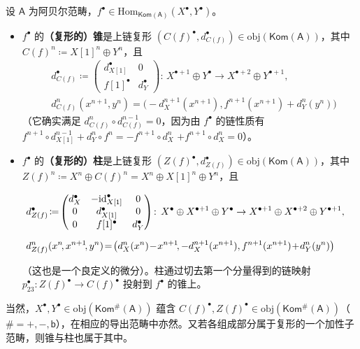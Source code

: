 \begin{Def}\label{coneofcomplexes}
	设 $\mathsf{A}$ 为阿贝尔范畴，$f^\bullet\in\text{Hom}_\mathsf{Kom(A)}(X^\bullet, Y^\bullet)$。
	\begin{itemize}[leftmargin=0.5cm]
		\item $f^\bullet$ 的\textbf{（复形的）锥}是上链复形 $(C(f)^\bullet, d_{C(f)}^\bullet)\in\text{obj}(\mathsf{Kom(A)})$，其中 $C(f)^n\coloneqq X[1]^n\oplus Y^n$，且
		\begin{align}
			&d_{C(f)}^\bullet \coloneqq \begin{pmatrix} d_{X[1]}^\bullet & 0 \\ f[1]^\bullet & d_Y^\bullet \end{pmatrix}\!:\,X^{\bullet+1}\oplus Y^\bullet\rightarrow X^{\bullet+2}\oplus Y^{\bullet+1}, \nonumber\\[0.2cm] 
			&d_{C(f)}^n(x^{n+1},y^n)=\big(-d_X^{n+1}(x^{n+1}),f^{n+1}(x^{n+1})+d_Y^n(y^n)\big)
		\end{align}
		（它确实满足 $d_{C(f)}^n\circ d_{C(f)}^{n-1}=0$，因为由 $f^\bullet$ 的链性质有 $f^{n+1}\circ d_{X[1]}^{n-1} + d_Y^n\circ f^n= -f^{n+1}\circ d_X^n$ $+ f^{n+1}\circ d_X^n=0$）。 
		
		\item $f^\bullet$ 的\textbf{（复形的）柱}是上链复形 $(Z(f)^\bullet, d_{Z(f)}^\bullet)\in\text{obj}(\mathsf{Kom(A)})$，其中 $Z(f)^n\coloneqq X^n\oplus C(f)^n= X^n\oplus X[1]^n\oplus Y^n$，且 
		\begingroup
		\allowdisplaybreaks
		\begin{small}\begin{align}
				&\mkern-16mu d_{Z(f)}^\bullet \!\coloneqq\! \begin{pmatrix} d_X^\bullet & -\text{id}_{X[1]}^\bullet & 0 \\ 0 & d_{X[1]}^\bullet & 0 \\ 0 & f[1]^\bullet & d_Y^\bullet \end{pmatrix}\!:\, X^\bullet\oplus X^{\bullet+1}\oplus Y^\bullet\rightarrow X^{\bullet+1}\oplus X^{\bullet+2}\oplus Y^{\bullet+1}, \nonumber\\[0.2cm]
				&\mkern-16mu d_{Z(f)}^n(x^n\!,x^{n+1}\!,y^n)\!=\!\big(d_X^n(x^n)\!-\! x^{n+1}\!,-d_X^{n+1}(x^{n+1}), f^{n+1}(x^{n+1})\!+\! d_Y^n(y^n)\big)
		\end{align}\end{small}
		\endgroup%
		（这也是一个良定义的微分）。柱通过切去第一个分量得到的链映射 $p_{23}^\bullet:Z(f)^\bullet\rightarrow C(f)^\bullet$ 投射到 $f^\bullet$ 的锥上。
	\end{itemize}
	当然，$X^\bullet, Y^\bullet\in\text{obj}(\mathsf{Kom^\#\!(A)})$ 蕴含 $C(f)^\bullet, Z(f)^\bullet\in\text{obj}(\mathsf{Kom^\#\!(A)})$（$\#=+,-,\mathsf{b}$），在相应的导出范畴中亦然。又若各组成部分属于复形的一个加性子范畴，则锥与柱也属于其中。 
\end{Def}

